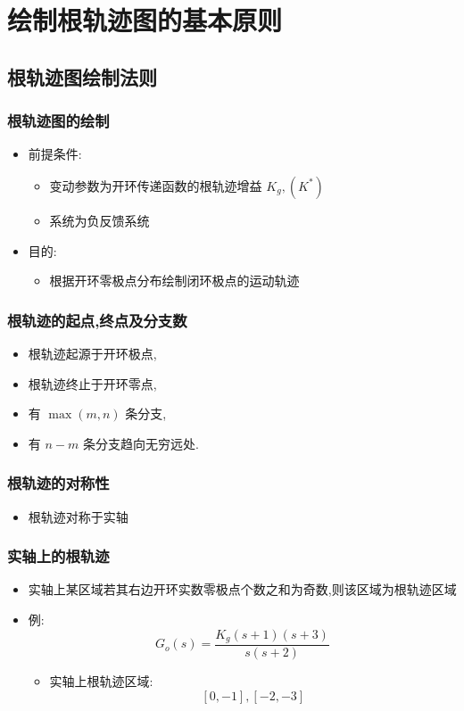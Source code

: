 \documentclass{article}
\begin{document}
\section{绘制根轨迹图的基本原则}
\label{sec-2}
\subsection{根轨迹图绘制法则}
\label{sec-2-1}
\begin{frame}
\frametitle{根轨迹图的绘制}
\label{sec-2-1-1}

\begin{itemize}
\item 前提条件:
\begin{itemize}
\item <2->变动参数为开环传递函数的根轨迹增益  $K_g,(K^*)$
\item <3->系统为负反馈系统
\end{itemize}
\item 目的:
\begin{itemize}
\item 根据开环零极点分布绘制闭环极点的运动轨迹
\end{itemize}
\end{itemize}
\end{frame}
\begin{frame}
\frametitle{根轨迹的起点,终点及分支数}
\label{sec-2-1-2}

\begin{itemize}
\item <2->根轨迹起源于开环极点,
\item <3->根轨迹终止于开环零点,
\item <4->有  $\max(m,n)$  条分支,
\item <5->有 $n-m$ 条分支趋向无穷远处.
\end{itemize}
\end{frame}
\begin{frame}
\frametitle{根轨迹的对称性}
\label{sec-2-1-3}

\begin{itemize}
\item <2->根轨迹对称于实轴
\end{itemize}
\end{frame}
\begin{frame}
\frametitle{实轴上的根轨迹}
\label{sec-2-1-4}

\begin{itemize}
\item <2->实轴上某区域若其右边开环实数零极点个数之和为奇数,则该区域为根轨迹区域
\item <2->例:  
     \[G_o(s)=\frac{K_g(s+1)(s+3)}{s(s+2)}\]
\begin{itemize}
\item <3-> 实轴上根轨迹区域:  
             \[ [0,-1],[-2,-3] \]
\end{itemize}
\end{itemize}
\end{frame}
\end{document}
